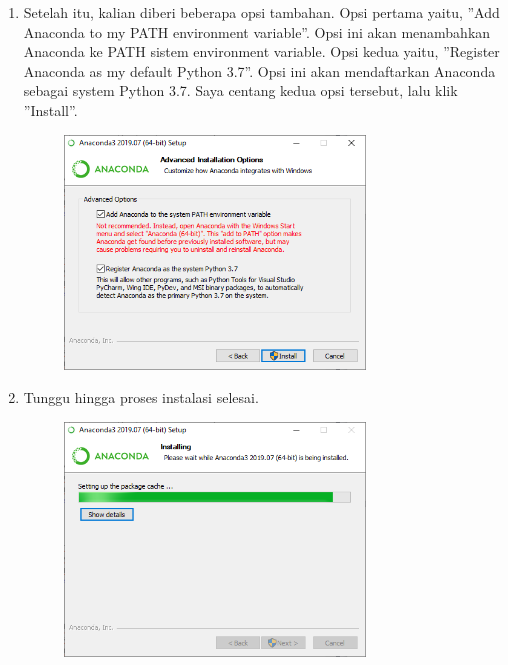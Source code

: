 \begin{enumerate}
	\item Setelah itu, kalian diberi beberapa opsi tambahan. Opsi pertama yaitu, ''Add Anaconda to my PATH environment variable''. Opsi ini akan menambahkan Anaconda ke PATH sistem environment variable. Opsi kedua yaitu, ''Register Anaconda as my default Python 3.7''. Opsi ini akan mendaftarkan Anaconda sebagai system Python 3.7. Saya centang kedua opsi tersebut, lalu klik ''Install''.
	\begin{figure}[!htbp]
		\includegraphics[width=8cm]{figures/Anaconda4.PNG}
		\centering
	\end{figure}
\newpage
	\item Tunggu hingga proses instalasi selesai.
	\begin{figure}[!htbp]
		\includegraphics[width=8cm]{figures/anaconda5.PNG}
		\centering
	\end{figure}


\end{enumerate}
